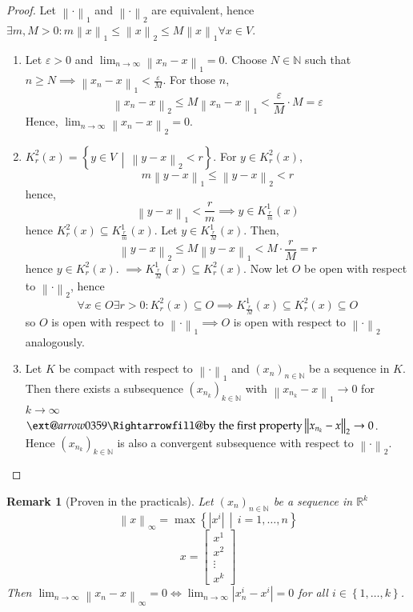 \documentclass{article}
\makeatletter
\newtheorem{remark}{Remark}  \numberwithin{remark}{section}
\newcommand{\set}[1]{\left\{#1\right\}}
\newcommand{\setdef}[2]{\left\{\left.#1\,\middle|\,#2\right.\right\}}
\newcommand{\norm}[1]{\left\|#1\right\|}
\newcommand{\card}[1]{\left|#1\right|}
\newcommand{\xRightarrow}[2][]{\ext@arrow 0359\Rightarrowfill@{#1}{#2}}
\makeatother
\begin{document}
\begin{proof}
  Let $\norm{\cdot}_1$ and $\norm{\cdot}_2$ are equivalent, hence $\exists m, M > 0: m \norm{x}_1 \leq \norm{x}_2 \leq M \norm{x}_1 \forall x \in V$.
  \begin{enumerate}
    \item Let $\varepsilon > 0$ and $\lim_{n\to\infty} \norm{x_n - x}_1 = 0$.
      Choose $N \in \mathbb N$ such that $n \geq N \implies \norm{x_n - x}_1 < \frac{\varepsilon}{M}$. For those $n$,
      \[ \norm{x_n - x}_2 \leq M \norm{x_n - x}_1 < \frac{\varepsilon}{M} \cdot M = \varepsilon \]
      Hence, $\lim_{n\to\infty} \norm{x_n - x}_2 = 0$.
    \item $K_r^2(x) = \setdef{y \in V}{\norm{y - x}_2 < r}$. For $y \in K_r^2(x)$,
      \[ m \norm{y - x}_1 \leq \norm{y - x}_2 < r \]
      hence,
      \[ \norm{y - x}_1 < \frac rm \implies y \in K_{\frac rm}^1(x) \]
      hence $K_r^2(x) \subseteq K_{\frac rm}^1(x)$.
      Let $y \in K_{\frac rM}^1(x)$. Then,
      \[ \norm{y - x}_2 \leq M \norm{y - x}_1 < M \cdot \frac rM = r \]
      hence $y \in K_r^2(x)$. $\implies K_{\frac rM}^1(x) \subseteq K_r^2(x)$.
      Now let $O$ be open with respect to $\norm{\cdot}_2$, hence
      \[ \forall x \in O \exists r > 0: K_r^2(x) \subseteq O \implies K_{\frac rM}^1(x) \subseteq K_r^2(x) \subseteq O \]
      so $O$ is open with respect to $\norm{\cdot}_1 \implies O$ is open with respect to $\norm{\cdot}_2$ analogously.
    \item
      Let $K$ be compact with respect to $\norm{\cdot}_1$ and $(x_n)_{n \in \mathbb N}$ be a sequence in $K$.
      Then there exists a subsequence $(x_{n_k})_{k \in \mathbb N}$ with $\norm{x_{n_k} - x}_1 \to 0$ for $k \to \infty$
      $\xRightarrow{\text{by the first property}} \norm{x_{n_k} - x}_2 \to 0$. Hence $(x_{n_k})_{k \in \mathbb N}$ is also a convergent subsequence with respect to $\norm{\cdot}_2$.
  \end{enumerate}
\end{proof}

\begin{remark}[Proven in the practicals]
  Let $(x_n)_{n\in\mathbb N}$ be a sequence in $\mathbb R^k$
  \[ \norm{x}_{\infty} = \max\setdef{\card{x^i}}{i = 1, \dots, n} \]
  \[ x = \begin{bmatrix} x^1 \\ x^2 \\ \vdots \\ x^k \end{bmatrix} \]
  Then $\lim_{n\to\infty} \norm{x_n - x}_{\infty} = 0 \iff \lim_{n\to\infty} \card{x_n^i - x^i} = 0$ for all $i \in \set{1, \dots, k}$.
\end{remark}
\end{document}
